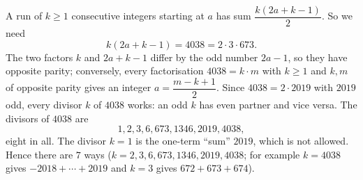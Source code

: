 A run of $k\ge1$ consecutive integers starting at $a$ has sum $\dfrac{k(2a+k-1)}{2}$. So we need
\[
k(2a+k-1)=4038=2\cdot3\cdot673 .
\]
The two factors $k$ and $2a+k-1$ differ by the odd number $2a-1$, so they have opposite parity; conversely, every factorisation $4038=k\cdot m$ with $k\ge1$ and $k,m$ of opposite parity gives an integer $a=\dfrac{m-k+1}{2}$. Since $4038=2\cdot2019$ with $2019$ odd, every divisor $k$ of $4038$ works: an odd $k$ has even partner and vice versa. The divisors of $4038$ are
\[
1,2,3,6,673,1346,2019,4038 ,
\]
eight in all. The divisor $k=1$ is the one-term ``sum'' $2019$, which is not allowed. Hence there are $\boxed{7}$ ways ($k=2,3,6,673,1346,2019,4038$; for example $k=4038$ gives $-2018+\cdots+2019$ and $k=3$ gives $672+673+674$).
